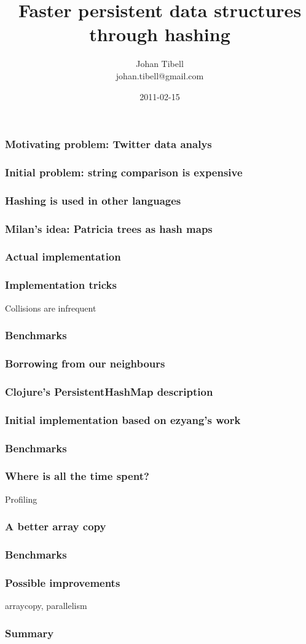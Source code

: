 \documentclass{beamer}
\title{Faster persistent data structures through hashing}
\author{Johan Tibell\\johan.tibell@gmail.com}
\date{2011-02-15}
\begin{document}
\lstset{language=Haskell}

\frame{\titlepage}

\begin{frame}
  \frametitle{Motivating problem: Twitter data analys}
\end{frame}

\begin{frame}
  \frametitle{Initial problem: string comparison is expensive}
\end{frame}

\begin{frame}
  \frametitle{Hashing is used in other languages}
\end{frame}

\begin{frame}
  \frametitle{Milan's idea: Patricia trees as hash maps}
\end{frame}

\begin{frame}
  \frametitle{Actual implementation}
\end{frame}

\begin{frame}
  \frametitle{Implementation tricks}
  Collisions are infrequent
\end{frame}

\begin{frame}
  \frametitle{Benchmarks}
\end{frame}

\begin{frame}
  \frametitle{Borrowing from our neighbours}
\end{frame}

\begin{frame}
  \frametitle{Clojure's PersistentHashMap description}
\end{frame}

\begin{frame}
  \frametitle{Initial implementation based on ezyang's work}
\end{frame}

\begin{frame}
  \frametitle{Benchmarks}
\end{frame}

\begin{frame}
  \frametitle{Where is all the time spent?}
  Profiling
\end{frame}

\begin{frame}
  \frametitle{A better array copy}
\end{frame}

\begin{frame}
  \frametitle{Benchmarks}
\end{frame}

\begin{frame}
  \frametitle{Possible improvements}
  arraycopy, parallelism
\end{frame}

\begin{frame}
  \frametitle{Summary}
\end{frame}
\end{document}
